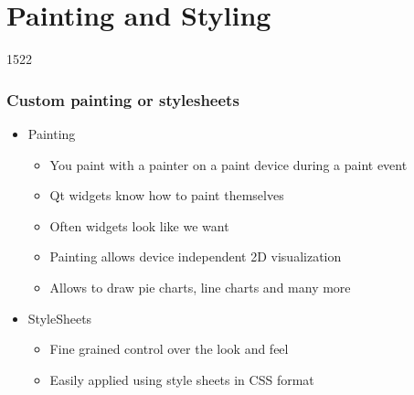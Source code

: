 %
%
%
%

\section{Painting and Styling}

\begin{slide}{1522}\frametitle{Custom painting or stylesheets}
  \begin{itemize}
  \item Painting
    \begin{itemize}
    \item You paint with a painter on a paint device during a paint event
    \item Qt widgets know how to paint themselves
    \item Often widgets look like we want
    \item Painting allows device independent 2D visualization
    \item Allows to draw pie charts, line charts and many more
    \end{itemize}
  \item StyleSheets
    \begin{itemize}
    \item Fine grained control over the look and feel
    \item Easily applied using style sheets in CSS format
    \end{itemize}
  \end{itemize}
\end{slide}


